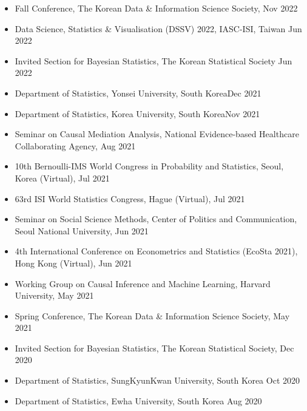 \documentclass[10pt]{article}
\newenvironment{innerlist}[1][\enskip\textbullet]%
        {\begin{itemize}[#1,leftmargin=*,parsep=0pt,itemsep=0pt,topsep=0pt,partopsep=0pt]}
        {\end{itemize}}
\begin{document}
\begin{innerlist}
\item[] Fall Conference, The Korean Data \& Information Science Society, \hfill Nov 2022\\
\item[] Data Science, Statistics \& Visualisation (DSSV) 2022, IASC-ISI, Taiwan \hfill Jun 2022\\
\item[] Invited Section for Bayesian Statistics, The Korean Statistical Society \hfill Jun 2022\\
\item[] Department of Statistics, Yonsei University, South Korea\hfill Dec 2021\\
\item[] Department of Statistics, Korea University, South Korea\hfill Nov 2021\\
\item[] Seminar on Causal Mediation Analysis, National Evidence-based Healthcare Collaborating Agency, \hfill Aug 2021\\
\item[] 10th Bernoulli-IMS World Congress in Probability and Statistics, Seoul, Korea (Virtual), \hfill Jul 2021\\
\item[] 63rd ISI World Statistics Congress, Hague (Virtual), \hfill Jul 2021\\
\item[] Seminar on Social Science Methods, Center of Politics and Communication, Seoul National University, \hfill Jun 2021\\
\item[] 4th International Conference on Econometrics and Statistics (EcoSta 2021), Hong Kong (Virtual), \hfill Jun 2021\\
\item[] Working Group on Causal Inference and Machine Learning, Harvard University, \hfill May 2021\\
\item[] Spring Conference, The Korean Data \& Information Science Society, \hfill May 2021\\
\item[] Invited Section for Bayesian Statistics, The Korean Statistical Society, \hfill Dec 2020\\
\item[] Department of Statistics, SungKyunKwan University, South Korea
  \hfill Oct 2020 \\
\item[] Department of Statistics, Ewha University, South Korea \hfill Aug 2020\\

\end{innerlist}
\end{document}
